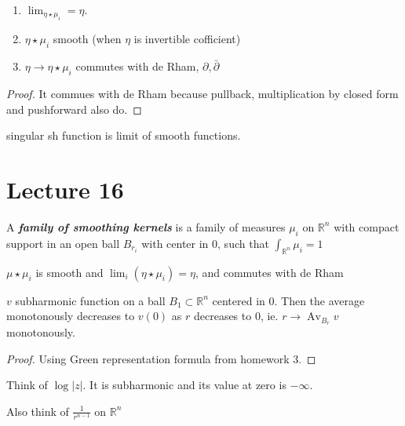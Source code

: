 \begin{claim}\leavevmode
\begin{enumerate}
\item \(\lim_{ \eta\star \mu_i} =\eta\).
\item \(\eta \star \mu_i\) smooth (when \(\eta\) is invertible cofficient)
\item \(\eta \to \eta \star \mu_i\) commutes with de Rham, \(\partial ,\bar\partial\)
\end{enumerate}
\end{claim}

\begin{proof}\leavevmode
It commues with de Rham because pullback, multiplication by closed form and pushforward also do.
\end{proof}

\begin{thm}\leavevmode
singular sh function is limit of smooth functions.
\end{thm}

\section{Lecture 16}

\begin{defn}\leavevmode
A \textit{\textbf{family of smoothing kernels}} is a family of measures \(\mu_i\) on \(\mathbb{R}^n\) with compact support in an open ball \(B_{r_i}\) with center in \(0\), such that \(\int_{\mathbb{R}^n}\mu_i=1\)
\end{defn}

\begin{claim}\leavevmode
\(\mu \star \mu_i\) is smooth and \(\lim_{i} (\eta \star\mu_i)=\eta\), and commutes with de Rham
\end{claim}

\begin{thm}\leavevmode
\(v \) subharmonic function on a ball \(B_1 \subset \mathbb{R}^n\) centered in 0. Then the average monotonously decreases to \(v(0)\) as  \(r\) decreases to 0, ie. \(r \to \operatorname{ A v}_{B_r}v\) monotonously.
\end{thm}

\begin{proof}\leavevmode
Using Green representation formula from homework 3.
\end{proof}

\begin{remark}\leavevmode
Think of \(\operatorname{log}|z|\). It is subharmonic and its value at zero is \(- \infty\).

Also think of \(\frac{1}{r^{n-1}}\) on \(\mathbb{R}^n\)
\end{remark}

